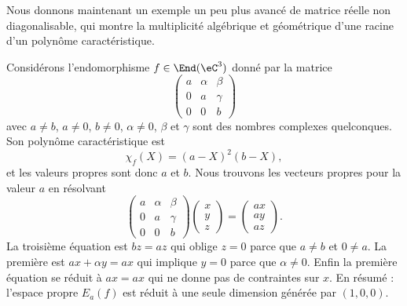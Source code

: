 Nous donnons maintenant un exemple un peu plus avancé de matrice réelle non diagonalisable, qui montre la multiplicité algébrique et géométrique d'une racine d'un polynôme caractéristique.

\begin{remark}  \label{RemBOGooCLMwyb}
    Considérons l'endomorphisme \( f\in\End(\eC^3)\) donné par la matrice
    \begin{equation}
        \begin{pmatrix}
            a    &  \alpha    &   \beta    \\
            0    &   a        &   \gamma   \\
            0    &   0        &   b
        \end{pmatrix}
    \end{equation}
    avec \( a\neq b\), \( a\neq 0\), \( b\neq 0\), \( \alpha\neq 0\), \( \beta\) et \( \gamma\) sont des nombres complexes quelconques.
    Son polynôme caractéristique est
    \begin{equation}
        \chi_f(X)=(a-X)^2(b-X),
    \end{equation}
    et les valeurs propres sont donc \( a\) et \( b\). Nous trouvons les vecteurs propres pour la valeur \( a\) en résolvant
    \begin{equation}
        \begin{pmatrix}
            a    &   \alpha   &   \beta    \\
            0    &   a        &   \gamma   \\
            0    &   0        &   b
        \end{pmatrix}\begin{pmatrix}
            x    \\
            y    \\
            z
        \end{pmatrix}=\begin{pmatrix}
            ax    \\
            ay    \\
            az
        \end{pmatrix}.
    \end{equation}
    La troisième équation est \( bz=az\) qui oblige \( z=0\) parce que \( a\neq b\) et \( 0\neq a\). La première est \( ax+\alpha y=ax\) qui implique \( y=0\) parce que \( \alpha\neq 0\). Enfin la première équation se réduit à \( ax=ax\) qui ne donne pas de contraintes sur \( x\). En résumé : l'espace propre \( E_a(f)\) est réduit à une seule dimension générée par \( (1,0,0)\).


\end{remark}
